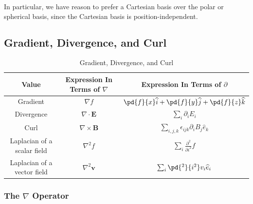\documentclass[10pt]{mypackage}
\begin{document}
In particular, we have reason to prefer a Cartesian basis over the polar or spherical basis, since the Cartesian basis is position-independent.
\subsection{Gradient, Divergence, and Curl}%
\begin{table}
  \centering
  \renewcommand{\arraystretch}{1.5}
  \begin{tabular}{c|c|c}
    Value & Expression In Terms of $\nabla$ & Expression In Terms of $\partial$\\
    \hline\hline
    Gradient & $\nabla f$ & $\pd{f}{x} \widehat{i} + \pd{f}{y}\widehat{j} + \pd{f}{z}\widehat{k}$\\
    Divergence & $\nabla \cdot \mathbf{E}$ & $\sum_{i}\partial_i E_i$\\
    Curl & $\nabla \times \mathbf{B}$ & $\sum_{i,j,k}\epsilon_{ijk}\partial_{i}B_j\widehat{e}_k$\\
    Laplacian of a scalar field & $\nabla^2 f$ & $\sum_{i}\frac{\partial^2}{\partial i^2}f$\\
    Laplacian of a vector field & $\nabla^2\mathbf{v}$ & $\sum_{i}\pd{^2}{i^2}v_i \widehat{e}_i$
  \end{tabular}
  \caption{Gradient, Divergence, and Curl}
\end{table}
\subsubsection{The $\nabla$ Operator}%
\end{document}
